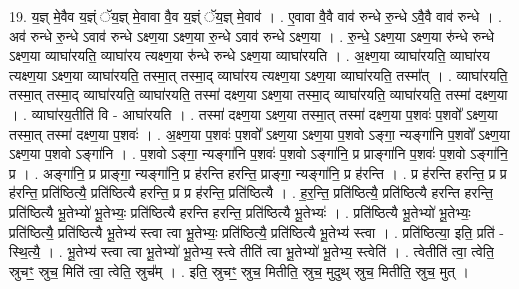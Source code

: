 \documentclass[17pt]{extarticle}
\begin{document}
19. य॒ज्ञ् मे॒वैव य॒ज्ञ्ं ॅय॒ज्ञ् मे॒वावा वै॒व य॒ज्ञ्ं ॅय॒ज्ञ् मे॒वाव॑ । . ए॒वावा वै॒वै वाव॑ रुन्धे रु॒न्धे ऽवै॒वै वाव॑ रुन्धे । . अव॑ रुन्धे रु॒न्धे ऽवाव॑ रुन्धे ऽक्ष्ण॒या ऽक्ष्ण॒या रु॒न्धे ऽवाव॑ रुन्धे ऽक्ष्ण॒या । . रु॒न्धे॒ ऽक्ष्ण॒या ऽक्ष्ण॒या रु॑न्धे रुन्धे ऽक्ष्ण॒या व्याघा॑रयति॒ व्याघा॑रय त्यक्ष्ण॒या रु॑न्धे रुन्धे ऽक्ष्ण॒या व्याघा॑रयति । . अ॒क्ष्ण॒या व्याघा॑रयति॒ व्याघा॑रय त्यक्ष्ण॒या ऽक्ष्ण॒या व्याघा॑रयति॒ तस्मा॒त् तस्मा॒द् व्याघा॑रय त्यक्ष्ण॒या ऽक्ष्ण॒या व्याघा॑रयति॒ तस्मा᳚त् । . व्याघा॑रयति॒ तस्मा॒त् तस्मा॒द् व्याघा॑रयति॒ व्याघा॑रयति॒ तस्मा॑ दक्ष्ण॒या ऽक्ष्ण॒या तस्मा॒द् व्याघा॑रयति॒ व्याघा॑रयति॒ तस्मा॑ दक्ष्ण॒या । . व्याघा॑रय॒तीति॑ वि - आघा॑रयति । . तस्मा॑ दक्ष्ण॒या ऽक्ष्ण॒या तस्मा॒त् तस्मा॑ दक्ष्ण॒या प॒शवः॑ प॒शवो᳚ ऽक्ष्ण॒या तस्मा॒त् तस्मा॑ दक्ष्ण॒या प॒शवः॑ । . अ॒क्ष्ण॒या प॒शवः॑ प॒शवो᳚ ऽक्ष्ण॒या ऽक्ष्ण॒या प॒शवो ऽङ्गा॒ न्यङ्गा॑नि प॒शवो᳚ ऽक्ष्ण॒या ऽक्ष्ण॒या प॒शवो ऽङ्गा॑नि । . प॒शवो ऽङ्गा॒ न्यङ्गा॑नि प॒शवः॑ प॒शवो ऽङ्गा॑नि॒ प्र प्राङ्गा॑नि प॒शवः॑ प॒शवो ऽङ्गा॑नि॒ प्र । . अङ्गा॑नि॒ प्र प्राङ्गा॒ न्यङ्गा॑नि॒ प्र ह॑रन्ति हरन्ति॒ प्राङ्गा॒ न्यङ्गा॑नि॒ प्र ह॑रन्ति । . प्र ह॑रन्ति हरन्ति॒ प्र प्र ह॑रन्ति॒ प्रति॑ष्ठित्यै॒ प्रति॑ष्ठित्यै हरन्ति॒ प्र प्र ह॑रन्ति॒ प्रति॑ष्ठित्यै । . ह॒र॒न्ति॒ प्रति॑ष्ठित्यै॒ प्रति॑ष्ठित्यै हरन्ति हरन्ति॒ प्रति॑ष्ठित्यै भू॒तेभ्यो॑ भू॒तेभ्यः॒ प्रति॑ष्ठित्यै हरन्ति हरन्ति॒ प्रति॑ष्ठित्यै भू॒तेभ्यः॑ । . प्रति॑ष्ठित्यै भू॒तेभ्यो॑ भू॒तेभ्यः॒ प्रति॑ष्ठित्यै॒ प्रति॑ष्ठित्यै भू॒तेभ्य॑ स्त्वा त्वा भू॒तेभ्यः॒ प्रति॑ष्ठित्यै॒ प्रति॑ष्ठित्यै भू॒तेभ्य॑ स्त्वा । . प्रति॑ष्ठित्या॒ इति॒ प्रति॑ - स्थि॒त्यै॒ । . भू॒तेभ्य॑ स्त्वा त्वा भू॒तेभ्यो॑ भू॒तेभ्य॒ स्त्वे तीति॑ त्वा भू॒तेभ्यो॑ भू॒तेभ्य॒ स्त्वेति॑ । . त्वेतीति॑ त्वा॒ त्वेति॒ स्रुचꣳ॒॒ स्रुच॒ मिति॑ त्वा॒ त्वेति॒ स्रुच᳚म् । . इति॒ स्रुचꣳ॒॒ स्रुच॒ मितीति॒ स्रुच॒ मुदुथ् स्रुच॒ मितीति॒ स्रुच॒ मुत् । \newline
\end{document}
